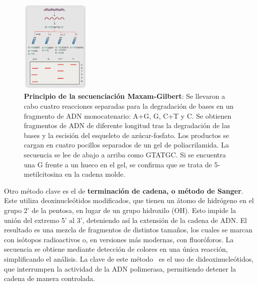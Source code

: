 \begin{figure}[htbp]
\centering
\includegraphics[width = 0.3\textwidth]{figs/maxam-gilbert.png}
\caption{\textbf{Principio de la secuenciación Maxam-Gilbert}: Se llevaron a cabo cuatro reacciones separadas para la degradación de bases en un fragmento de ADN monocatenario: A+G, G, C+T y C. Se obtienen fragmentos de ADN de diferente longitud tras la degradación de las bases y la escisión del esqueleto de azúcar-fosfato. Los productos se cargan en cuatro pocillos separados de un gel de poliacrilamida. La secuencia se lee de abajo a arriba como GTATGC. Si se encuentra una G frente a un hueco en el gel, se confirma que se trata de 5-metilcitosina en la cadena molde.}
\end{figure}

Otro método clave es el de \textbf{terminación de cadena, o método de Sanger}. Este utiliza deoxinucleótidos modificados, que tienen un átomo de hidrógeno en el grupo 2' de la pentosa, en lugar de un grupo hidroxilo (OH). Esto impide la unión del extremo 5' al 3', deteniendo así la extensión de la cadena de ADN. El resultado es una mezcla de fragmentos de distintos tamaños, los cuales se marcan con isótopos radioactivos o, en versiones más modernas, con fluoróforos. La secuencia se obtiene mediante detección de colores en una única reacción, simplificando el análisis. La clave de este método  \ es el uso de dideoxinucleótidos, que interrumpen la actividad de la ADN polimerasa, permitiendo detener la cadena de manera controlada.

